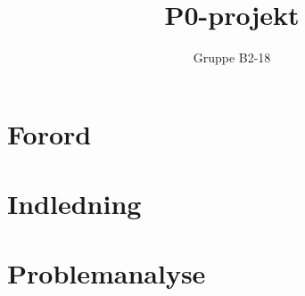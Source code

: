 \documentclass[12pt,hidelinks]{article}
\begin{document}
    \sloppy
	\title{P0-projekt}
	\author{Gruppe B2-18}
	\maketitle
	\section{Forord}
	\tableofcontents
	\section{Indledning}
	\section{Problemanalyse}
	
	
	
	
	
	
	
	
\end{document}
